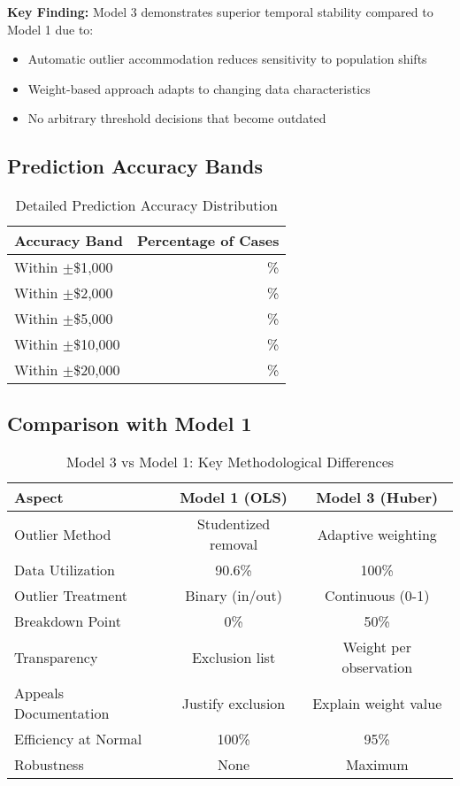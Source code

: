 \textbf{Key Finding:} Model 3 demonstrates superior temporal stability compared to Model 1 due to:
\begin{itemize}
    \item Automatic outlier accommodation reduces sensitivity to population shifts
    \item Weight-based approach adapts to changing data characteristics
    \item No arbitrary threshold decisions that become outdated
\end{itemize}

\subsection{Prediction Accuracy Bands}

\begin{table}[ht]
\centering
\caption{Detailed Prediction Accuracy Distribution}
\begin{tabular}{lr}
\toprule
\textbf{Accuracy Band} & \textbf{Percentage of Cases} \\
\midrule
Within $\pm$\$1,000 & \ModelThreeWithinOneK{}\% \\
Within $\pm$\$2,000 & \ModelThreeWithinTwoK{}\% \\
Within $\pm$\$5,000 & \ModelThreeWithinFiveK{}\% \\
Within $\pm$\$10,000 & \ModelThreeWithinTenK{}\% \\
Within $\pm$\$20,000 & \ModelThreeWithinTwentyK{}\% \\
\bottomrule
\end{tabular}
\end{table}

\subsection{Comparison with Model 1}

\begin{table}[ht]
\centering
\caption{Model 3 vs Model 1: Key Methodological Differences}
\begin{tabular}{lcc}
\toprule
\textbf{Aspect} & \textbf{Model 1 (OLS)} & \textbf{Model 3 (Huber)} \\
\midrule
Outlier Method & Studentized removal & Adaptive weighting \\
Data Utilization & 90.6\% & 100\% \\
Outlier Treatment & Binary (in/out) & Continuous (0-1) \\
Breakdown Point & 0\% & 50\% \\
Transparency & Exclusion list & Weight per observation \\
Appeals Documentation & Justify exclusion & Explain weight value \\
Efficiency at Normal & 100\% & 95\% \\
Robustness & None & Maximum \\
\bottomrule
\end{tabular}
\end{table}

